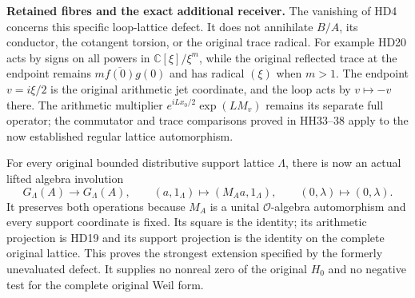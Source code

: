 \HD\textbf{Retained fibres and the exact additional receiver.}
The vanishing of HD4 concerns this specific loop-lattice defect.
It does not annihilate $B/A$, its conductor, the cotangent torsion,
or the original trace radical. For example HD20 acts by signs
on all powers in $\mathbb C[\xi]/\xi^m$, while the original
reflected trace at the endpoint remains
$m\overline{f(0)}g(0)$ and has radical $(\xi)$ when $m>1$.
The endpoint $v=i\xi/2$ is the original arithmetic jet coordinate,
and the loop acts by $v\mapsto-v$ there. The arithmetic multiplier
$e^{iLx_0/2}\exp(LM_v)$ remains its separate full operator;
the commutator and trace comparisons proved in HH33--38 apply
to the now established regular lattice automorphism.

For every original bounded distributive support lattice $\Lambda$,
there is now an actual lifted algebra involution
\[
 G_\Lambda(A)\longrightarrow G_\Lambda(A),\qquad
 (a,1_\Lambda)\longmapsto(M_Aa,1_\Lambda),\qquad
 (0,\lambda)\longmapsto(0,\lambda).
 \tag{HD44}
\]
It preserves both operations because $M_A$ is a unital
$\mathcal O$-algebra automorphism and every support coordinate
is fixed. Its square is the identity; its arithmetic projection
is HD19 and its support projection is the identity on the
complete original lattice. This proves the strongest extension
specified by the formerly unevaluated defect.
It supplies no nonreal zero of the original $H_0$ and no negative
test for the complete original Weil form.

